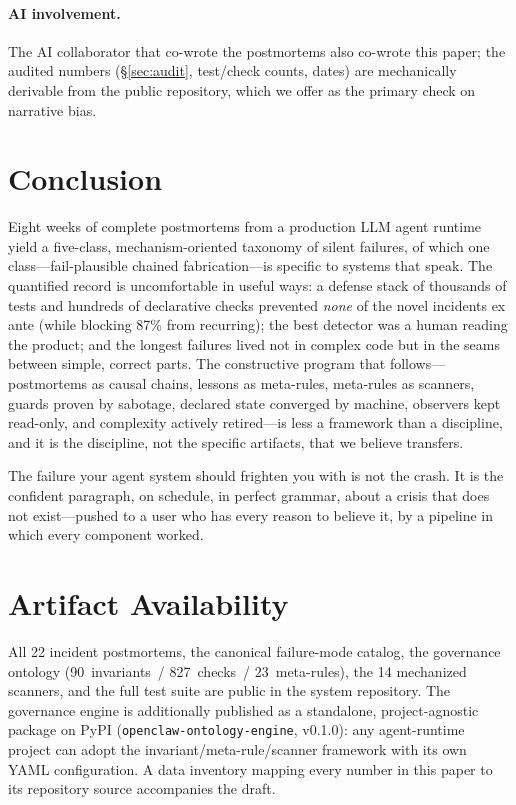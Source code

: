 \paragraph{AI involvement.} The AI collaborator that co-wrote the
postmortems also co-wrote this paper; the audited numbers
(\S\ref{sec:audit}, test/check counts, dates) are mechanically derivable
from the public repository, which we offer as the primary check on
narrative bias.

\section{Conclusion}\label{sec:conclusion}

Eight weeks of complete postmortems from a production LLM agent runtime
yield a five-class, mechanism-oriented taxonomy of silent failures, of
which one class---fail-plausible chained fabrication---is specific to
systems that speak. The quantified record is uncomfortable in useful
ways: a defense stack of thousands of tests and hundreds of declarative
checks prevented \emph{none} of the novel incidents ex ante (while
blocking 87\% from recurring); the best detector was a human reading the
product; and the longest failures lived not in complex code but in the
seams between simple, correct parts. The constructive program that
follows---postmortems as causal chains, lessons as meta-rules, meta-rules
as scanners, guards proven by sabotage, declared state converged by
machine, observers kept read-only, and complexity actively retired---is
less a framework than a discipline, and it is the discipline, not the
specific artifacts, that we believe transfers.

The failure your agent system should frighten you with is not the crash.
It is the confident paragraph, on schedule, in perfect grammar, about a
crisis that does not exist---pushed to a user who has every reason to
believe it, by a pipeline in which every component worked.

\section*{Artifact Availability}

All 22 incident postmortems, the canonical failure-mode catalog, the
governance ontology (90~invariants~/ 827~checks~/ 23~meta-rules), the 14
mechanized scanners, and the full test suite are public in the system
repository. The governance engine is additionally published as a
standalone, project-agnostic package on PyPI
(\texttt{openclaw-ontology-engine}, v0.1.0): any agent-runtime project
can adopt the invariant/meta-rule/scanner framework with its own YAML
configuration. A data inventory mapping every number in this paper to its
repository source accompanies the draft.

